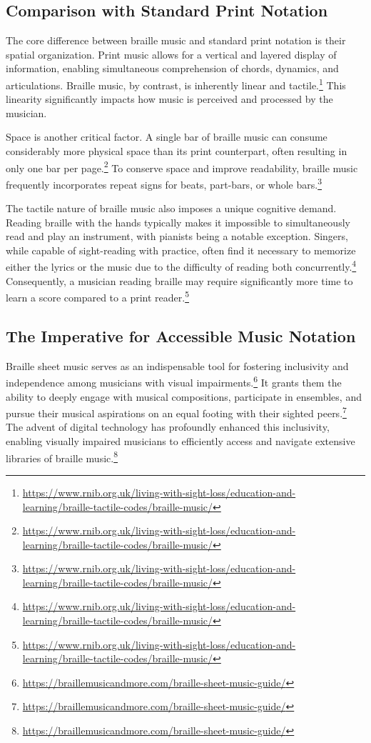 \subsection{Comparison with Standard Print Notation}
The core difference between braille music and standard print notation is their spatial organization. Print music allows for a vertical and layered display of information, enabling simultaneous comprehension of chords, dynamics, and articulations. Braille music, by contrast, is inherently linear and tactile.\footnote{\url{https://www.rnib.org.uk/living-with-sight-loss/education-and-learning/braille-tactile-codes/braille-music/}} This linearity significantly impacts how music is perceived and processed by the musician.

Space is another critical factor. A single bar of braille music can consume considerably more physical space than its print counterpart, often resulting in only one bar per page.\footnote{\url{https://www.rnib.org.uk/living-with-sight-loss/education-and-learning/braille-tactile-codes/braille-music/}} To conserve space and improve readability, braille music frequently incorporates repeat signs for beats, part-bars, or whole bars.\footnote{\url{https://www.rnib.org.uk/living-with-sight-loss/education-and-learning/braille-tactile-codes/braille-music/}}

The tactile nature of braille music also imposes a unique cognitive demand. Reading braille with the hands typically makes it impossible to simultaneously read and play an instrument, with pianists being a notable exception. Singers, while capable of sight-reading with practice, often find it necessary to memorize either the lyrics or the music due to the difficulty of reading both concurrently.\footnote{\url{https://www.rnib.org.uk/living-with-sight-loss/education-and-learning/braille-tactile-codes/braille-music/}} Consequently, a musician reading braille may require significantly more time to learn a score compared to a print reader.\footnote{\url{https://www.rnib.org.uk/living-with-sight-loss/education-and-learning/braille-tactile-codes/braille-music/}}

\subsection{The Imperative for Accessible Music Notation}
Braille sheet music serves as an indispensable tool for fostering inclusivity and independence among musicians with visual impairments.\footnote{\url{https://braillemusicandmore.com/braille-sheet-music-guide/}} It grants them the ability to deeply engage with musical compositions, participate in ensembles, and pursue their musical aspirations on an equal footing with their sighted peers.\footnote{\url{https://braillemusicandmore.com/braille-sheet-music-guide/}} The advent of digital technology has profoundly enhanced this inclusivity, enabling visually impaired musicians to efficiently access and navigate extensive libraries of braille music.\footnote{\url{https://braillemusicandmore.com/braille-sheet-music-guide/}}

